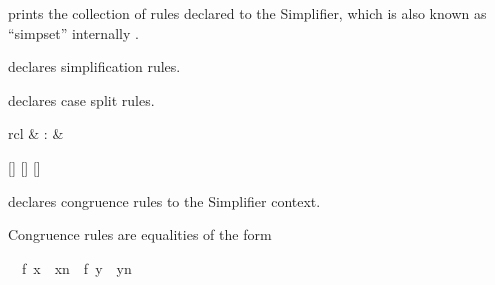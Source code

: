 \begin{isabellebody}
\begin{isamarkuptext}
  \begin{description}

  \item \hyperlink{command.print-simpset}{\mbox{}} prints the collection of rules
  declared to the Simplifier, which is also known as ``simpset''
  internally \cite{isabelle-ref}.

  \item \hyperlink{attribute.simp}{\mbox{}} declares simplification rules.

  \item \hyperlink{attribute.split}{\mbox{}} declares case split rules.

  \end{description}%
\end{isamarkuptext}%
\isamarkuptrue%
%
\isamarkuptrue%
%
\begin{isamarkuptext}%
\begin{matharray}{rcl}
    \hypertarget{attribute.cong}{\hyperlink{attribute.cong}{\mbox{}}} & : &  \\
  \end{matharray}

  \begin{railoutput}
[]
\rail@bar
{}
[]
[]
\rail@endbar
\rail@end
\end{railoutput}


  \begin{description}

  \item \hyperlink{attribute.cong}{\mbox{}} declares congruence rules to the Simplifier
  context.

  \end{description}

  Congruence rules are equalities of the form \begin{isabelle}%
{}{}\ {}\ f\ {}x\ {}\ {}x\isactrlsub n\ {}\ f\ {}y\ {}\ {}y\isactrlsub n{}%
\end{isabelle}


\end{isamarkuptext}
\end{isabellebody}
